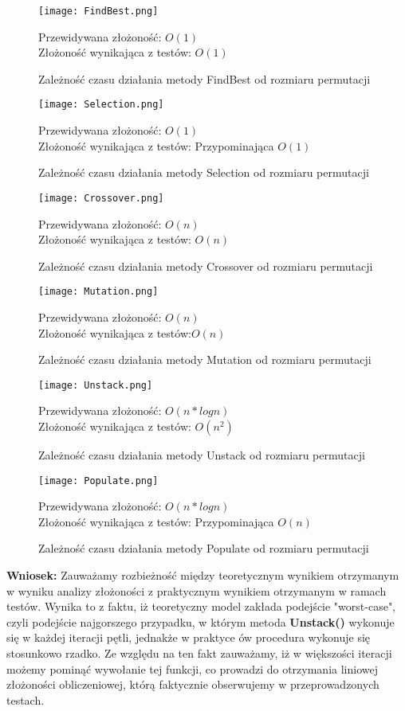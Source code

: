   \begin{figure}[H]
    \texttt{[image: FindBest.png]}
    \centering
    \caption{Zależność czasu działania metody FindBest od rozmiaru permutacji}
    Przewidywana złożoność: $O(1)$ \\
    Złożoność wynikająca z testów: $O(1)$ \\
  \end{figure}
  \begin{figure}[H]
    \texttt{[image: Selection.png]}
    \centering
    \caption{Zależność czasu działania metody Selection od rozmiaru permutacji}
    Przewidywana złożoność: $O(1)$ \\
    Złożoność wynikająca z testów: Przypominająca $O(1)$ \\
  \end{figure}
  \begin{figure}[H]
    \texttt{[image: Crossover.png]}
    \centering
    \caption{Zależność czasu działania metody Crossover od rozmiaru permutacji}
    Przewidywana złożoność: $O(n)$ \\
    Złożoność wynikająca z testów: $O(n)$ \\
  \end{figure}
  \begin{figure}[H]
    \texttt{[image: Mutation.png]}
    \centering
    \caption{Zależność czasu działania metody Mutation od rozmiaru permutacji}
    Przewidywana złożoność: $O(n)$ \\
    Złożoność wynikająca z testów:$O(n)$ \\
  \end{figure}
  \begin{figure}[H]
    \texttt{[image: Unstack.png]}
    \centering
    \caption{Zależność czasu działania metody Unstack od rozmiaru permutacji}
    Przewidywana złożoność: $O(n*logn)$ \\
    Złożoność wynikająca z testów: $O(n^{2})$ \\
  \end{figure}
  \begin{figure}[H]
    \texttt{[image: Populate.png]}
    \centering
    \caption{Zależność czasu działania metody Populate od rozmiaru permutacji}
    Przewidywana złożoność: $O(n*logn)$ \\
    Złożoność wynikająca z testów: Przypominająca $O(n)$ \\
  \end{figure}


  \textbf{Wniosek:}
  Zauważamy rozbieżność między teoretycznym wynikiem otrzymanym w wyniku analizy złożoności z praktycznym wynikiem otrzymanym w ramach testów.
  Wynika to z faktu, iż teoretyczny model zakłada podejście "worst-case", czyli podejście najgorszego przypadku, w którym metoda \textbf{Unstack()} wykonuje się w każdej iteracji pętli,
  jednakże w praktyce ów procedura wykonuje się stosunkowo rzadko. Ze względu na ten fakt zauważamy, iż w większości iteracji możemy pominąć wywołanie tej funkcji, co prowadzi do otrzymania
  liniowej złożoności obliczeniowej, którą faktycznie obserwujemy w przeprowadzonych testach.
